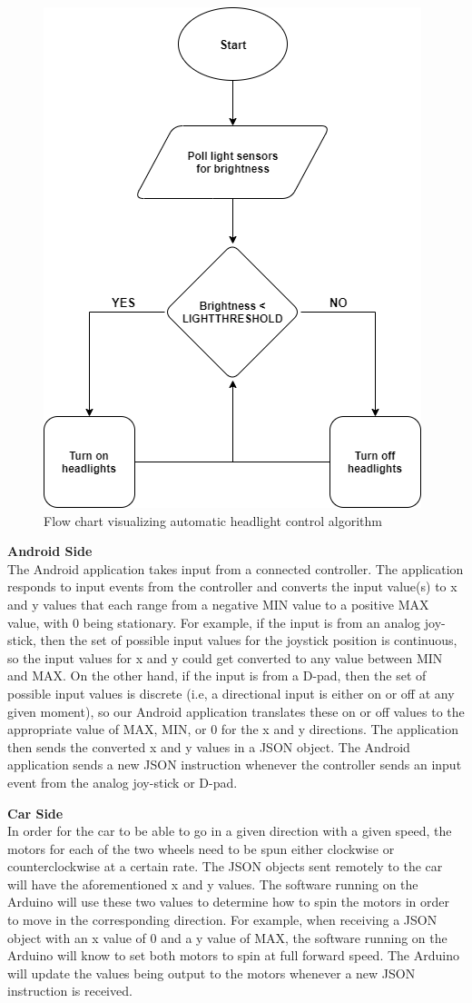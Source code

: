 \documentclass[letterpaper,12pt]{report}
\begin{document}
    \begin{figure}[H]
        \centering
        \includegraphics[width=0.6\linewidth]{diagrams/Headlights_Flowchart.png}
        \caption{Flow chart visualizing automatic headlight control algorithm}
        \label{fig:headlights}
    \end{figure}

    \textbf{Android Side}\\ [0.5em]
    The Android application takes input from a connected controller. The
    application responds to input events from the controller and converts the
    input value(s) to x and y values that each range from a negative MIN value
    to a positive MAX value, with 0 being stationary. For example, if the input
    is from an analog joy-stick, then the set of possible input values for the
    joystick position is continuous, so the input values for x and y could get
    converted to any value between MIN and MAX. On the other hand, if the input
    is from a D-pad, then the set of possible input values is discrete (i.e, a
    directional input is either on or off at any given moment), so our Android
    application translates these on or off values to the appropriate value of
    MAX, MIN, or 0 for the x and y directions. The application then sends the
    converted x and y values in a JSON object. The Android application sends a
    new JSON instruction whenever the controller sends an input event from the
    analog joy-stick or D-pad.

    \textbf{Car Side}\\ [0.5em]
    In order for the car to be able to go in a given direction with a given
    speed, the motors for each of the two wheels need to be spun either
    clockwise or counterclockwise at a certain rate. The JSON objects sent
    remotely to the car will have the aforementioned x and y values. The
    software running on the Arduino will use these two values to determine how
    to spin the motors in order to move in the corresponding direction.  For
    example, when receiving a JSON object with an x value of 0 and a y value of
    MAX, the software running on the Arduino will know to set both motors to
    spin at full forward speed. The Arduino will update the values being output
    to the motors whenever a new JSON instruction is received.
\end{document}
